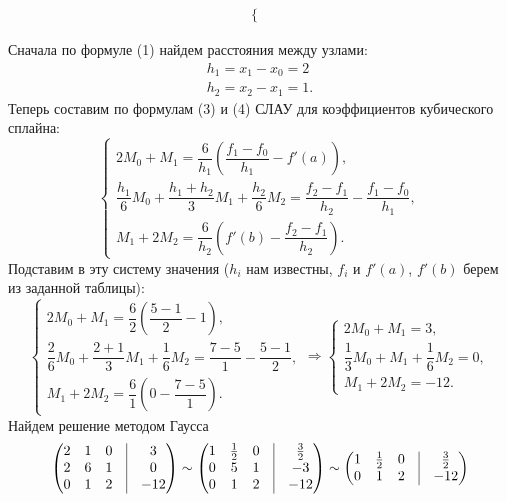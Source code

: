 \documentclass[a4paper, 12pt]{article}
\begin{document}
\begin{enumerate}
\begin{enumerate}
\begin{eqnarray}
\begin{cases}
				\end{cases}
			\end{eqnarray}
		\end{enumerate}
		Сначала по формуле (1) найдем расстояния между узлами:
		$$\begin{matrix}
			h_1 = x_1 - x_0 = 2\\
			h_2 = x_2 - x_1 = 1.
		\end{matrix}$$
		Теперь составим по формулам (3) и (4) СЛАУ для коэффициентов кубического сплайна:
		$$\begin{cases}
			2M_0 + M_1 =  \dfrac{6}{h_1}\left(\dfrac{f_1-f_0}{h_1} - f'(a)\right),\\
			\dfrac{h_1}{6}M_{0} + \dfrac{h_1 + h_{2}}{3}M_1 + \dfrac{h_{2}}{6}M_{2} = \dfrac{f_{2} - f_1}{h_{2}} - \dfrac{f_1 - f_{0}}{h_1},\\
			M_{1} + 2M_2 = \dfrac{6}{h_2}\left(f'(b) - \dfrac{f_2-f_{1}}{h_2} \right).
		\end{cases}$$
		Подставим в эту систему значения ($h_i$ нам известны, $f_i$ и $f'(a)$, $f'(b)$ берем из заданной таблицы):
		$$\begin{cases}
			2M_0 + M_1 =  \dfrac{6}{2}\left(\dfrac{5-1}{2} - 1\right),\\
			\dfrac{2}{6}M_{0} + \dfrac{2 +1}{3}M_1 + \dfrac{1}{6}M_{2} = \dfrac{7 -5}{1} - \dfrac{5 - 1}{2},\\
			M_{1} + 2M_2 = \dfrac{6}{1}\left(0 - \dfrac{7-5}{1} \right).
		\end{cases}
		\Rightarrow 
		\begin{cases}
			2M_0 + M_1 =  3,\\
			\dfrac{1}{3}M_{0} + M_1 + \dfrac{1}{6}M_{2} = 0,\\
			M_{1} + 2M_2 = -12.
		\end{cases}$$
		Найдем решение методом Гаусса 
		$$\begin{pmatrix}
			2&1&0&\vline&3\\
			2&6&1&\vline&0\\
			0&1&2&\vline&-12
		\end{pmatrix}
		\sim 
		\begin{pmatrix}
			1&\frac12&0&\vline&\frac32\\
			0&5&1&\vline&-3\\
			0&1&2&\vline&-12
		\end{pmatrix}
		\sim
		\begin{pmatrix}
			1&\frac12&0&\vline&\frac32\\
			0&1&2&\vline&-12\\

\end{pmatrix}$$
\end{enumerate}
\end{document}
